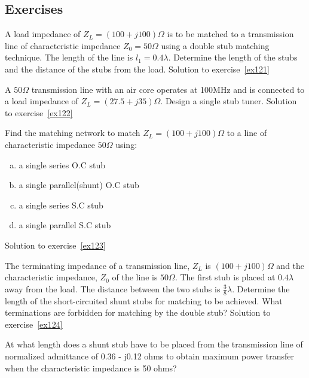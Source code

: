 \begin{mdframed}[ backgroundcolor=lightblue, linewidth=1pt, hidealllines=true]
\section*{Exercises}
\begin{ExerciseList}
\Exercise[label={ex121}]
A load impedance of $Z_{L} = (100 + j100)\Omega$ is to be matched to a transmission line of characteristic impedance $Z_0 = 50\Omega$ using a double stub matching technique. The length of the line is $l_{1} = 0.4\lambda$. Determine the length of the stubs and the distance of the stubs from the load.
\Answer[ref={ex121}]
Solution to exercise~\ref{ex121}

\Exercise[label={ex122}]
A $50\varOmega$ transmission line with an air core operates at 100MHz and is connected to a load impedance of $Z_L = (27.5 + j35)\varOmega$. Design a single stub tuner.
\Answer[ref={ex122}]
Solution to exercise~\ref{ex122}

\Exercise[label={ex123}]
Find the matching network to match $Z_L = (100 + j100)\varOmega$ to a line of characteristic impedance $50\varOmega$ using:
\begin{enumerate}[(a)]
\item a single series O.C stub
\item a single parallel(shunt) O.C stub
\item a single series S.C stub
\item a single parallel S.C stub
\end{enumerate}
\Answer[ref={ex123}]
Solution to exercise~\ref{ex123}

\Exercise[label={ex124}]
The terminating impedance of a transmission line, $Z_L$ is $(100 + j100)\varOmega$ and the characteristic impedance, $Z_0$ of the line is  $50\varOmega$. The first stub is placed at $0.4\lambda$ away from the load. The distance between the two stubs is $\frac{3}{8}\lambda$. Determine the length of the short-circuited shunt stubs for matching to be achieved. What terminations are forbidden for matching by the double stub?
\Answer[ref={ex124}]
Solution to exercise~\ref{ex124}

\Exercise[label={ex125}] 
At what length does a shunt stub have to be placed from the transmission line of normalized admittance of 0.36 - j0.12 ohms to obtain maximum power transfer when the characteristic impedance is 50 ohms?
\Answer[ref={ex125}]


\end{ExerciseList}
\end{mdframed}
